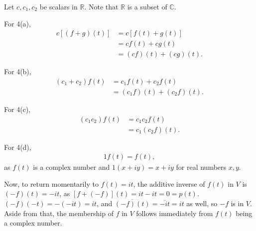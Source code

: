 \documentclass[12pt]{article}
\begin{document}
\begin{enumerate}
    Let $c,c_1,c_2$ be scalars in $\mathbb{R}$. Note that $\mathbb{R}$ is a subset of
    $\mathbb{C}$.

    For 4(a),
    \begin{align*}
      c[(f + g)(t)] &= c[f(t) + g(t)]\\
                    &= cf(t) + cg(t)\\
                    &= (cf)(t) + (cg)(t).
    \end{align*}

    For 4(b),
    \begin{align*}
      (c_1 + c_2)f(t) &= c_1f(t) + c_2f(t)\\
                      &= (c_1f)(t) + (c_2f)(t).
    \end{align*}

    For 4(c),
    \begin{align*}
      (c_1c_2)f(t) &= c_1c_2f(t)\\
                   &= c_1(c_2f)(t).
    \end{align*}

    For 4(d),
    \begin{align*}
      1f(t) = f(t),
    \end{align*}
    as $f(t)$ is a complex number and $1(x + iy) = x + iy$ for real numbers $x,y$.

    Now, to return momentarily to $f(t) = it$, the additive inverse of $f(t)$ in $V$
    is $(-f)(t) = -it$, as $[f + (-f)](t) = it - it = 0 = p(t)$. $(-f)(-t) = -(-it) =
    it$, and $\overline{(-f)(t)} = \overline{-it} = it$ as well, so $-f$ is in $V$.
    Aside from that, the membership of $f$ in $V$ follows immediately from $f(t)$
    being a complex number.
\end{enumerate}
\end{document}
